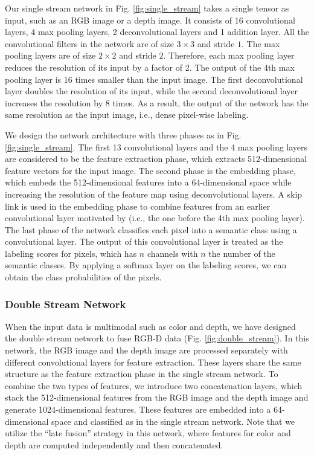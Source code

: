 \documentclass[conference]{IEEEtran}
\begin{document}
Our single stream network in Fig. \ref{fig:single_stream} takes a single tensor as input, such as an RGB image or a depth image. It consists of 16 convolutional layers, 4 max pooling layers, 2 deconvolutional layers and 1 addition layer. All the convolutional filters in the network are of size $3 \times 3$ and stride $1$. The max pooling layers are of size $2 \times 2$ and stride $2$. Therefore, each max pooling layer reduces the resolution of its input by a factor of 2. The output of the 4th max pooling layer is 16 times smaller than the input image. The first deconvolutional layer doubles the resolution of its input, while the second deconvolutional layer increases the resolution by 8 times. As a result, the output of the network has the same resolution as the input image, i.e., dense pixel-wise labeling.

We design the network architecture with three phases as in Fig. \ref{fig:single_stream}. The first 13 convolutional layers and the 4 max pooling layers are considered to be the feature extraction phase, which extracts 512-dimensional feature vectors for the input image. The second phase is the embedding phase, which embeds the 512-dimensional features into a 64-dimensional space while increasing the resolution of the feature map using deconvolutional layers. A skip link is used in the embedding phase to combine features from an earlier convolutional layer motivated by \cite{long2015fully} (i.e., the one before the 4th max pooling layer). The last phase of the network classifies each pixel into a semantic class using a convolutional layer. The output of this convolutional layer is treated as the labeling scores for pixels, which has $n$ channels with $n$ the number of the semantic classes. By applying a softmax layer on the labeling scores, we can obtain the class probabilities of the pixels.


\subsubsection{Double Stream Network}

When the input data is multimodal such as color and depth, we have designed the double stream network to fuse RGB-D data (Fig. \ref{fig:double_stream}). In this network, the RGB image and the depth image are processed separately with different convolutional layers for feature extraction. These layers share the same structure as the feature extraction phase in the single stream network. To combine the two types of features, we introduce two concatenation layers, which stack the 512-dimensional features from the RGB image and the depth image and generate 1024-dimensional features. These features are embedded into a 64-dimensional space and classified as in the single stream network. Note that we utilize the ``late fusion'' strategy in this network, where features for color and depth are computed independently and then concatenated.
\end{document}
